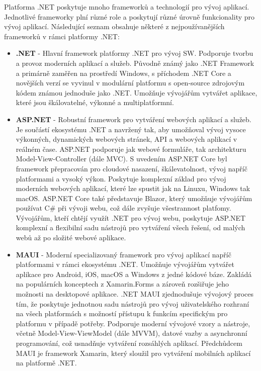 
Platforma .NET poskytuje mnoho frameworků a technologií pro vývoj aplikací. Jednotlivé frameworky plní různé role a poskytují různé úrovně funkcionality pro vývoj aplikací. \cite{Price2023c8} Následující seznam obsahuje některé z nejpoužívanějších frameworků v rámci platformy .NET:

\begin{itemize}
    \item \textbf{.NET} - Hlavní framework platformy .NET pro vývoj SW. Podporuje tvorbu a provoz moderních aplikací a služeb. \cite{Price2023c8} Původně známý jako .NET Framework a primárně zaměřen na prostředí Windows, s příchodem .NET Core a novějších verzí se vyvinul v modulární platformu s open-source zdrojovým kódem známou jednoduše jako .NET. Umožňuje vývojářům vytvářet aplikace, které jsou škálovatelné, výkonné a multiplatformní.
    \item \textbf{ASP.NET} - Robustní framework pro vytváření webových aplikací a služeb. Je součástí ekosystému .NET a navržený tak, aby umožňoval vývoj vysoce výkonných, dynamických webových stránek, API a webových aplikací v reálném čase. \cite{Danylko2023} ASP.NET podporuje jak webové formuláře, tak architekturu Model-View-Controller (dále MVC). S uvedením ASP.NET Core byl framework přepracován pro cloudové nasazení, škálevatolnost, vývoj napříč platformami a vysoký výkon. Poskytuje komplexní základ pro vývoj moderních webových aplikací, které lze spustit jak na Linuxu, Windows tak macOS. ASP.NET Core také představuje Blazor, který umožňuje vývojářům používat C\# při vývoji webu, což dále zvyšuje všestrannost platfomy. \cite{aspnetdocs} Vývojářům, kteří chtějí využít .NET pro vývoj webu, poskytuje ASP.NET komplexní a flexibilní sadu nástrojů pro vytváření všech řešení, od malých webů až po složité webové aplikace. 
    \item \textbf{MAUI} - Moderní specializovaný framework pro vývoj aplikací napříč platformami v rámci ekosystému .NET. Umožňuje vývojářům vytvářet aplikace pro Android, iOS, macOS a Windows z jedné kódové báze. Zakládá na populárních konceptech z Xamarin.Forms a zároveň rozšiřuje jeho možnosti na desktopové aplikace. .NET MAUI zjednodušuje vývojový proces tím, že poskytuje jednotnou sadu nástrojů pro vývoj uživatelského rozhraní na všech platformách s možností přístupu k funkcím specifickým pro platformu v případě potřeby. \cite{Libery2023} Podporuje moderní vývojové vzory a nástroje, včetně Model-View-ViewModel (dále MVVM), datové vazby a asynchronní programování, což usnadňuje vytváření rozsáhlých aplikací. Předchůdcem MAUI je framework Xamarin, který sloužil pro vytváření mobilních aplikací na platformě .NET. 

\end{itemize}
